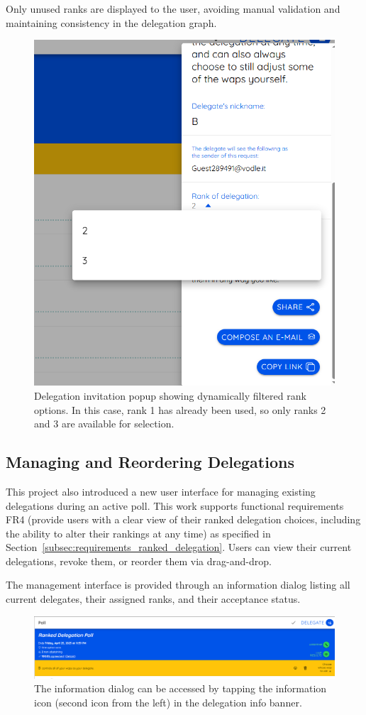 Only unused ranks are displayed to the user, avoiding manual validation and maintaining consistency in the delegation graph.

\begin{figure}[H]
  \centering
  \includegraphics[width=0.4\linewidth]{../common/vodle_screenshots/ranked_inv.png}
  \caption{Delegation invitation popup showing dynamically filtered rank options. In this case, rank 1 has already been used, so only ranks 2 and 3 are available for selection.}
  \label{fig:ranked_invite}
\end{figure}

\subsection{Managing and Reordering Delegations}

This project also introduced a new user interface for managing existing delegations during an active poll. This work supports functional requirements FR4 (provide users with a clear view of their ranked delegation choices, including the ability to alter their rankings at any time) as specified in Section~\ref{subsec:requirements_ranked_delegation}. Users can view their current delegations, revoke them, or reorder them via drag-and-drop.

The management interface is provided through an information dialog listing all current delegates, their assigned ranks, and their acceptance status.

\begin{figure}[H]
  \centering
  \includegraphics[width=\linewidth]{../common/vodle_screenshots/ranked_where_info_button.png}
  \caption{The information dialog can be accessed by tapping the information icon (second icon from the left) in the delegation info banner.}
\end{figure}

